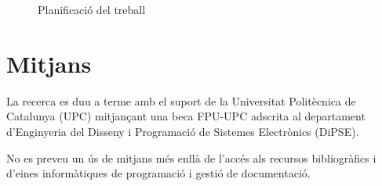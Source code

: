 \begin{figure}[tp]
\begin{gantt}[xunitlength=0.8cm]{15}{12}
  \begin{ganttitle}
  \end{ganttitle}
  \begin{ganttitle}
  \end{ganttitle}







\end{gantt}
\caption{Planificació del treball}
\label{fig:pla:futur}
\end{figure}


\section{Mitjans}

La recerca es duu a terme amb el suport de la Universitat Politècnica
de Catalunya (UPC) mitjançant una beca FPU-UPC adscrita al departament
d'Enginyeria del Disseny i Programació de Sistemes Electrònics
(DiPSE).


No es preveu un ús de mitjans més enllà de l'accés als
recursos bibliogràfics i d'eines informàtiques de programació i
gestió de documentació.










